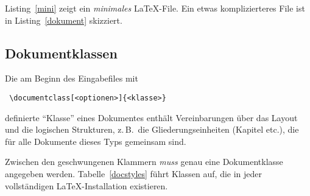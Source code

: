 Listing~\ref{mini} zeigt ein \emph{minimales} \LaTeX-File. Ein etwas
komplizierteres File ist in Listing~\ref{dokument} skizziert.




\subsection{Dokumentklassen}\label{docsty}

Die am Beginn des Eingabefiles  mit
\begin{lstlisting}
 \documentclass[<optionen>]{<klasse>}
\end{lstlisting}
definierte "`Klasse"' eines Dokumentes enthält Vereinbarungen über das Layout
und die logischen Strukturen, z.\,B.\ die Gliederungseinheiten (Kapitel etc.\@),
die für alle Dokumente dieses Typs gemeinsam sind.

Zwischen den geschwungenen Klammern \emph{muss} genau eine Dokumentklasse
angegeben werden.  Tabelle~\vref{docstyles} führt
Klassen auf, die in jeder vollständigen \LaTeX-Installation existieren.

